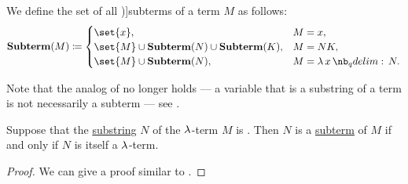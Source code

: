 \begin{definition}\label{def:lambda_subterm}
  We define the set of all \term[ru=подтерм (\cite[189]{Герасимов2011})]{subterms} of a term \( M \) as follows:
  \begin{equation*}
    \op*{Subterm}(M) \coloneqq \begin{cases}
      \set{ x },                                                 &M = x, \\
      \set{M} \cup \op*{Subterm}(N) \cup \op*{Subterm}(K), &M = N K, \\
      \set{M} \cup \op*{Subterm}(N),                          &M = \qabs x N.
    \end{cases}
  \end{equation*}
\end{definition}
\begin{comments}
  \item Note that the analog of  no longer holds --- a variable that is a substring of a term is not necessarily a subterm --- see .
\end{comments}

\begin{proposition}\label{thm:lambda_subterm_characterization}
  Suppose that the \hyperref[def:formal_language/substring]{substring} \( N \) of the \( \mathrm{\lambda} \)-term \( M \) is . Then \( N \) is a \hyperref[def:lambda_subterm]{subterm} of \( M \) if and only if \( N \) is itself a \( \mathrm{\lambda} \)-term.
\end{proposition}
\begin{proof}
  We can give a proof similar to .
\end{proof}

